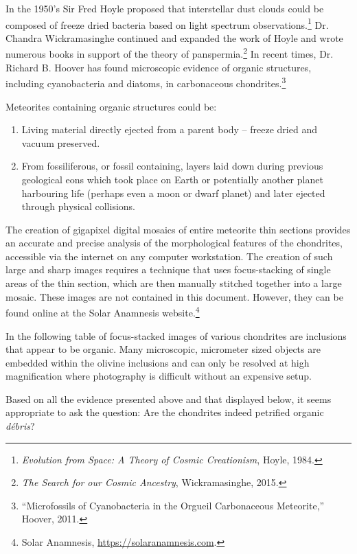 \documentclass[a4paper, 12pt, oneside]{article}
\begin{document}
In the 1950's Sir Fred Hoyle proposed that interstellar dust clouds could be composed of freeze dried bacteria based on light spectrum observations.\footnote{\emph{Evolution from Space: A Theory of Cosmic Creationism}, Hoyle, 1984.} Dr. Chandra Wickramasinghe continued and expanded the work of Hoyle and wrote numerous books in support of the theory of panspermia.\footnote{\emph{The Search for our Cosmic Ancestry}, Wickramasinghe, 2015.} In recent times, Dr. Richard B. Hoover has found microscopic evidence of organic structures, including cyanobacteria and diatoms, in carbonaceous chondrites.\footnote{``Microfossils of Cyanobacteria in the Orgueil Carbonaceous Meteorite,'' Hoover, 2011.}

Meteorites containing organic structures could be:

\begin{enumerate}
   \item Living material directly ejected from a parent body -- freeze dried and vacuum preserved.
   \item From fossiliferous, or fossil containing, layers laid down during previous geological eons which took place on Earth or potentially another planet harbouring life (perhaps even a moon or dwarf planet) and later ejected through physical collisions.
\end{enumerate}

The creation of gigapixel digital mosaics of entire meteorite thin sections provides an accurate and precise analysis of the morphological features of the chondrites, accessible via the internet on any computer workstation. The creation of such large and sharp images requires a technique that uses focus-stacking of single areas of the thin section, which are then manually stitched together into a large mosaic. These images are not contained in this document. However, they can be found online at the Solar Anamnesis website.\footnote{Solar Anamnesis, \url{https://solaranamnesis.com}.}

In the following table of focus-stacked images of various chondrites are inclusions that appear to be organic. Many microscopic, micrometer sized objects are embedded within the olivine inclusions and can only be resolved at high magnification where photography is difficult without an expensive setup.

Based on all the evidence presented above and that displayed below, it seems appropriate to ask the question: Are the chondrites indeed petrified organic \emph{débris}?
\clearpage
\end{document}
